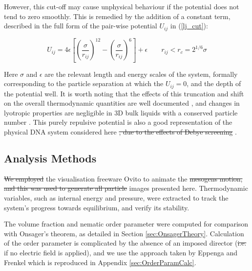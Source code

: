 \documentclass[11pt, a4paper]{article} %
\providecommand{\DIFadd}[1]{{\protect\color{blue}\uwave{#1}}} %
\providecommand{\DIFdel}[1]{{\protect\color{red}\sout{#1}}}                      %
\providecommand{\DIFaddbegin}{} %
\providecommand{\DIFaddend}{} %
\providecommand{\DIFdelbegin}{} %
\providecommand{\DIFdelend}{} %
\begin{document}
However, this cut-off may cause unphysical behaviour if the potential does not tend to zero smoothly. This is remedied by the addition of a constant term, described in the full form of the pair-wise potential $U_{ij}$ in (\ref{lj_cut}):

\begin{equation} \label{lj_cut}
U_{ij} = 4\epsilon \left[ \left( \frac{\sigma}{r_{ij}} \right) ^{12} - \left( \frac{\sigma}{r_{ij}} \right) ^{6}	\right] + \epsilon \qquad	 r_{ij} < r_{c} = 2^{1/6} \sigma
\end{equation}

Here $\sigma$ and $\epsilon$ are the relevant length and energy scales of the system, formally corresponding to the particle separation at which the $U_{ij} = 0$, and the depth of the potential well. It is worth noting that the effects of this truncation and shift on the overall thermodynamic quantities are well documented \cite{Stephan2020, Shaul2010}, and changes in lyotropic properties are negligible in 3D bulk liquids with a conserved particle number \cite{Smit1991}. This purely repulsive potential is also a good representation of the physical DNA system considered here \DIFdelbegin \DIFdel{, due to the effects of Debye screening }\DIFdelend \cite{Strey1997, Strey1998}.

 
\subsection{Analysis Methods}
\DIFdelbegin \DIFdel{We employed }\DIFdelend \DIFaddbegin \DIFadd{\textcolor{forestgreen}{We employed} }\DIFaddend the visualisation freeware Ovito \cite{Ovito} to animate the \DIFdelbegin \DIFdel{mesogens motion, and this was used to generate all particle }\DIFdelend \DIFaddbegin \DIFadd{\textcolor{forestgreen}{mesogens motion, and was used to generate all particle} }\DIFaddend images presented here. Thermodynamic variables, such as internal energy and pressure, were extracted to track the system's progress towards equilibrium, and verify its stability.

The volume fraction and nematic order parameter were computed for comparison with Onsager's theorem, as detailed in Section \ref{sec:OnsagerTheory}. Calculation of the order parameter is complicated by the absence of an imposed director (\DIFdelbegin \DIFdel{i.e. }\DIFdelend \DIFaddbegin \DIFadd{\textcolor{forestgreen}{i.e.} }\DIFaddend if no electric field is applied), and we use the approach taken by Eppenga and Frenkel \cite{Eppenga1984} which is reproduced in Appendix \ref{sec:OrderParamCalc}. %
\end{document}
